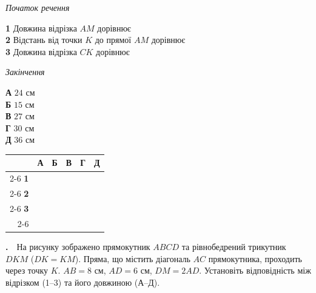 \documentclass[12pt]{article}
\newcommand{\matchingGrid}{%
    \begingroup
    \renewcommand{\arraystretch}{1.15}
    \setlength{\tabcolsep}{4pt}
    \footnotesize
    \begin{tabular}{r|c|c|c|c|c|}
         \multicolumn{1}{c}{} & \multicolumn{1}{c}{\textbf{А}} & \multicolumn{1}{c}{\textbf{Б}} & \multicolumn{1}{c}{\textbf{В}} & \multicolumn{1}{c}{\textbf{Г}} & \multicolumn{1}{c}{\textbf{Д}} \\ \cline{2-6}
         \textbf{1} & \phantom{X} & \phantom{X} & \phantom{X} & \phantom{X} & \phantom{X} \\ \cline{2-6}
         \textbf{2} & & & & & \\ \cline{2-6}
         \textbf{3} & & & & & \\ \cline{2-6}
    \end{tabular}
    \endgroup
}
\newcounter{zad}
\newcommand{\zadnum}{\stepcounter{zad}\textbf{\thezad.}\ \ }
\begin{document}
\vspace{0.2cm}
\noindent
\begin{minipage}[t]{0.46\textwidth}
\textit{Початок речення}\par\vspace{0.2cm}
\textbf{1} \quad Довжина відрізка $AM$ дорівнює\\[0.2cm]
\textbf{2} \quad Відстань від точки $K$ до прямої $AM$ дорівнює\\[0.2cm]
\textbf{3} \quad Довжина відрізка $CK$ дорівнює
\end{minipage}
\hfill
\begin{minipage}[t]{0.28\textwidth}
\textit{Закінчення}\par\vspace{0.2cm}
\textbf{А} \quad $24$ см\\[0.15cm]
\textbf{Б} \quad $15$ см\\[0.15cm]
\textbf{В} \quad $27$ см\\[0.15cm]
\textbf{Г} \quad $30$ см\\[0.15cm]
\textbf{Д} \quad $36$ см
\end{minipage}
\hfill
\begin{minipage}[t]{0.2\textwidth}
\vspace{0.5cm}
\begin{flushright}\matchingGrid\end{flushright}
\end{minipage}

\vspace{0.7cm}

\zadnum На рисунку зображено прямокутник $ABCD$ та рівнобедрений трикутник $DKM$ ($DK = KM$). Пряма, що містить діагональ $AC$ прямокутника, проходить через точку $K$. $AB = 8$ см, $AD = 6$ см, $DM = 2AD$. Установіть відповідність між відрізком (1--3) та його довжиною (А--Д).

\vspace{0.3cm}
\begin{center}
\end{center}
\end{document}
